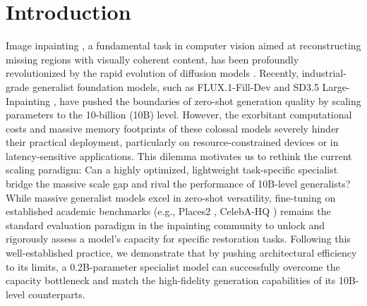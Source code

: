 \documentclass[runningheads]{llncs}
\begin{document}
\section{Introduction}\label{sec:intro}
\vspace{-0.5em}
Image inpainting \cite{Bertalmio2000imageinpaint}, a fundamental task in computer vision aimed at reconstructing missing regions with visually coherent content, has been profoundly revolutionized by the rapid evolution of diffusion models \cite{xu2025pixelhacker,Rombach2022LDM,flux2024}. Recently, industrial-grade generalist foundation models, such as FLUX.1-Fill-Dev \cite{flux2024} and SD3.5 Large-Inpainting \cite{esser2024SD3}, have pushed the boundaries of zero-shot generation quality by scaling parameters to the 10-billion (10B) level. However, the exorbitant computational costs and massive memory footprints of these colossal models severely hinder their practical deployment, particularly on resource-constrained devices or in latency-sensitive applications. This dilemma motivates us to rethink the current scaling paradigm: Can a highly optimized, lightweight task-specific specialist bridge the massive scale gap and rival the performance of 10B-level generalists? While massive generalist models excel in zero-shot versatility, fine-tuning on established academic benchmarks (e.g., Places2 \cite{zhou2017places}, CelebA-HQ \cite{karras2018celebahq}) remains the standard evaluation paradigm in the inpainting community \cite{suvorov2021lama, li2022mat} to unlock and rigorously assess a model's capacity for specific restoration tasks. Following this well-established practice, we demonstrate that by pushing architectural efficiency to its limits, a 0.2B-parameter specialist model can successfully overcome the capacity bottleneck and match the high-fidelity generation capabilities of its 10B-level counterparts.
\end{document}
